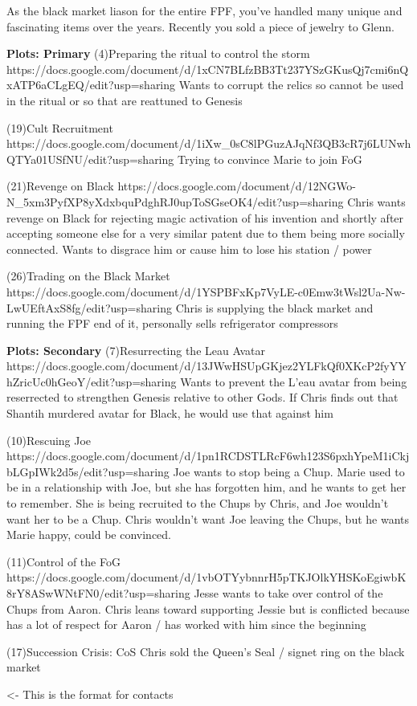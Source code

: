 \documentclass[char]{GL2020}
\begin{document}
As the black market liason for the entire FPF, you've handled many unique and fascinating items over the years.  Recently you sold a piece of jewelry to Glenn.  %

\textbf{Plots: Primary}
(4)Preparing the ritual to control the storm
https://docs.google.com/document/d/1xCN7BLfzBB3Tt237YSzGKusQj7cmi6nQxATP6aCLgEQ/edit?usp=sharing
Wants to corrupt the relics so cannot be used in the ritual or so that are reattuned to Genesis

(19)Cult Recruitment
https://docs.google.com/document/d/1iXw_0sC8lPGuzAJqNf3QB3cR7j6LUNwhQTYa01USfNU/edit?usp=sharing
Trying to convince Marie to join FoG

(21)Revenge on Black
https://docs.google.com/document/d/12NGWo-N_5xm3PyfXP8yXdxbquPdghRJ0upToSGseOK4/edit?usp=sharing
Chris wants revenge on Black for rejecting magic activation of his invention and shortly after accepting someone else for a very similar patent due to them being more socially connected.  Wants to disgrace him or cause him to lose his station / power

(26)Trading on the Black Market
https://docs.google.com/document/d/1YSPBFxKp7VyLE-c0Emw3tWsl2Ua-Nw-LwUEftAxS8fg/edit?usp=sharing
Chris is supplying the black market and running the FPF end of it, personally sells refrigerator compressors

\textbf{Plots: Secondary}
(7)Resurrecting the Leau Avatar
https://docs.google.com/document/d/13JWwHSUpGKjez2YLFkQf0XKcP2fyYYhZricUc0hGeoY/edit?usp=sharing
Wants to prevent the L'eau avatar from being reserrected to strengthen Genesis relative to other Gods.  If Chris finds out that Shantih murdered avatar for Black, he would use that against him

(10)Rescuing Joe
https://docs.google.com/document/d/1pn1RCDSTLRcF6wh123S6pxhYpeM1iCkjbLGpIWk2d5s/edit?usp=sharing
Joe wants to stop being a Chup.  Marie used to be in a relationship with Joe, but she has forgotten him, and he wants to get her to remember.  She is being recruited to the Chups by Chris, and Joe wouldn't want her to be a Chup.  Chris wouldn't want Joe leaving the Chups, but he wants Marie happy, could be convinced.

(11)Control of the FoG
https://docs.google.com/document/d/1vbOTYybnnrH5pTKJOlkYHSKoEgiwbK8rY8ASwWNtFN0/edit?usp=sharing
Jesse wants to take over control of the Chups from Aaron.  Chris leans toward supporting Jessie but is conflicted because has a lot of respect for Aaron / has worked with him since the beginning

(17)Succession Crisis: CoS
Chris sold the Queen's Seal / signet ring on the black market

\begin{itemz}[Goals]
	\item 
\end{itemz}

\begin{itemz}[Notes]
	\item 
\end{itemz}

\begin{contacts}
	\contact{\cTest{}} <- This is the format for contacts 
\end{contacts}
\end{document}
